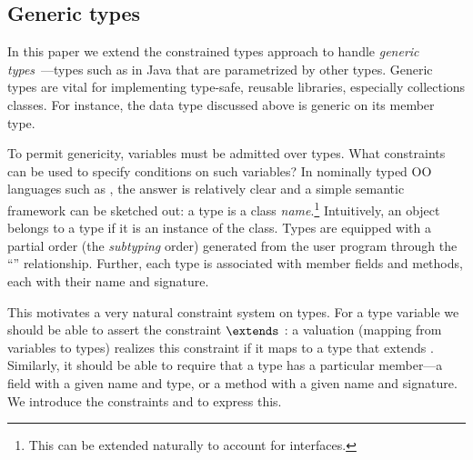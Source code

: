 \subsection{Generic types}

In this paper we extend the constrained types approach to handle
\emph{generic
types}~\cite{clu,ada,GJ,java-popl97,thorup97,Java3,csharp-generics}---types
such as  in Java that are parametrized by other
types. Generic types are vital for implementing type-safe, reusable
libraries, especially collections classes. For instance, the data type
 discussed above is generic on its member type.

To permit genericity, variables  must be admitted over types.
What constraints can be used to specify conditions on such variables?
In nominally typed OO languages such as \Java, the answer is
relatively clear and a simple semantic framework can be sketched out:
a type is a class \emph{name}.\footnote{This can be extended naturally
to account for interfaces.} Intuitively, an object belongs to a type
if it is an instance of the class. Types are equipped with a partial
order (the \emph{subtyping} order) generated from the user program
through the ``'' relationship.  Further, each type is
associated with member fields and methods, each with their
name and signature.
%

This motivates a very natural constraint system on types.  For a type
variable  we should be able to assert the constraint 
$\extends$ : a valuation (mapping from variables to types) realizes
this constraint if it maps  to a type that extends .
Similarly, it should be able to require that a type has a
particular member---a field with a given name and type, or a method
with a given name and signature. We introduce the constraints 
 and  to express this.


